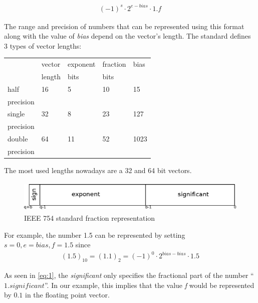 \documentclass[10pt]{article}
\begin{document}
\begin{align}
  {(-1)}^{s} \cdot 2^{e - bias} \cdot 1.f\label{eq:1}
\end{align}

\noindent The range and precision of numbers that can be represented using this format
along with the value of \textit{bias} depend on the vector's length. The
standard defines 3 types of vector lengths:

\begin{table}[h]\centering

      \begin{tabular}{|l|l|l|l|l|}
      \hline
      & vector & exponent & fraction & bias \\
      & length & bits & bits & \\
      \hline
      half & 16 & 5 & 10 & 15 \\
      precision & & & & \\
      \hline
      single & 32 & 8 & 23 & 127 \\
      precision & & & & \\
      \hline
      double & 64 & 11 & 52 & 1023 \\
      precision & & & & \\
      \hline
    \end{tabular}

\end{table}

\noindent{}The most used lengths nowadays are a 32 and 64 bit vectors.

\begin{figure}[h]
  \centering
  \includegraphics*[width=\textwidth, height=1.5cm]{ieee_754_format}
  \caption{IEEE 754 standard fraction representation}\label{fig:ieee754}
\end{figure}

\noindent{}For example, the number 1.5 can be represented by setting $s=0, e=bias, f=1.5$ since
\begin{align*}
  (1.5)_{10} = (1.1)_{2} = (-1)^{0} \cdot 2^{bias - bias} \cdot 1.5
\end{align*}

\noindent{}As seen in \autoref{eq:1}, the \textit{significant} only specifies the
fractional part of the number ``$1.significant$''. In our example, this implies that
the value \textit{f} would be represented by $0.1$ in the floating point vector.
\end{document}
